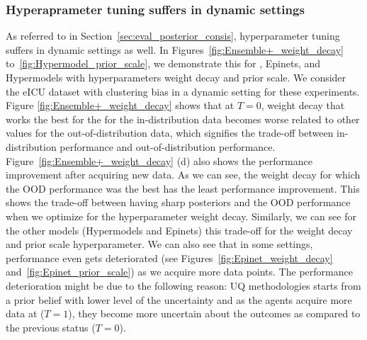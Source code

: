 \subsubsection{Hyperaprameter tuning suffers in dynamic settings}
As referred to in Section~\ref{sec:eval_posterior_consis}, hyperparameter tuning suffers in dynamic settings as well. 
In  Figures~\ref{fig:Ensemble+_weight_decay} 
to~\ref{fig:Hypermodel_prior_scale}, we demonstrate this for \ensembleplus, Epinets, and Hypermodels with hyperparameters weight decay and prior scale. We consider the eICU dataset with clustering bias in a dynamic setting for these experiments.
 Figure \ref{fig:Ensemble+_weight_decay}  shows that at $T=0$, weight decay that works the best for the \ensembleplus for the in-distribution data becomes worse related to other values for the 
out-of-distribution data, which  signifies the trade-off between in-distribution performance and out-of-distribution performance. 
Figure~\ref{fig:Ensemble+_weight_decay} (d) also shows  the performance improvement after acquiring new data.
As we can see, the weight decay for which the OOD performance was the best has the least performance improvement.
This shows the trade-off between having sharp posteriors and the OOD performance when we optimize for the hyperparameter weight decay. 
Similarly, we can see for the other models (Hypermodels and Epinets) this trade-off 
for the weight decay and prior scale hyperparameter.
We can also see that in some settings, performance even gets deteriorated (see Figures~\ref{fig:Epinet_weight_decay} 
and~\ref{fig:Epinet_prior_scale}) as we acquire more data points. 
The performance deterioration might be due to the following reason: UQ methodologies starts from a prior belief with lower level of the uncertainty and as the agents acquire more data at ($T=1$),
they become more uncertain about the outcomes as compared to the previous status ($T=0$). 
 


